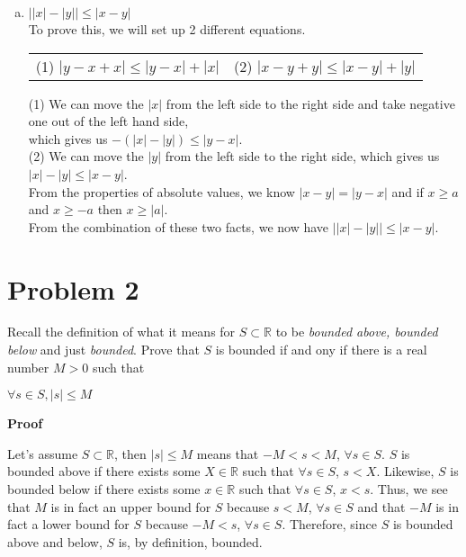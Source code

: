 \documentclass{article}
\newcommand\abs[1]{\left|#1\right|}
\begin{document}
\begin{flushleft}
\begin{enumerate}[(a)]
\item $\abs{\abs{x} - \abs{y}} \leq \abs{x-y}$ \\
\vspace{.5cm}
To prove this, we will set up 2 different equations. \\
\begin{center}
\begin{tabular}{c c}
(1) $\abs{y-x+x} \leq  \abs{y-x} + \abs{x}$ &
(2) $\abs{x-y+y} \leq \abs{x-y} + \abs{y}$ \\
\end{tabular}
\end{center}
(1) We can move the $\abs{x}$ from the left side to the right side and take negative one out of the left hand side, \\
which gives us $-(\abs{x}-\abs{y}) \leq \abs{y-x} $. \\
(2) We can move the $\abs{y}$ from the left side to the right side, which gives us $\abs{x}-\abs{y} \leq \abs{x-y}$. \\
\vspace{0.5cm}
From the properties of absolute values, we know $\abs{x-y} = \abs{y-x}$ and if $x \geq a$ and $x \geq -a$ then $x \geq \abs{a}$. \\

From the combination of these two facts, we now have $\abs{\abs{x}-\abs{y}} \leq \abs{x-y}$.
\end{enumerate}
\end{flushleft}

\section*{Problem 2}
\begin{flushleft}
Recall the definition of what it means for $S \subset \mathbb{R}$ to be \textit{bounded above, bounded below} and just \textit{bounded}. Prove that $S$ is bounded if and ony if there is a real number $M > 0$ such that
\begin{center}
$\forall s \in S, \abs{s} \leq M$
\end{center}

\textbf{Proof} \\
\vspace{.3cm}

Let's assume $S \subset \mathbb{R}$, then $\abs{s} \leq M$ means that $-M < s < M$, $\forall s \in S$. $S$ is bounded above if there exists some $X \in \mathbb{R}$ such that $\forall s \in S$, $s < X$. Likewise, $S$ is bounded below if there exists some $x \in \mathbb{R}$ such that $\forall s \in S$, $x < s$.  Thus, we see that $M$ is in fact an upper bound for $S$ because $s < M$, $\forall s \in S$ and that $-M$ is in fact a lower bound for $S$ because $-M < s$, $\forall s \in S$. Therefore, since $S$ is bounded above and below, $S$ is, by definition, bounded.
\end{flushleft}
\end{document}
